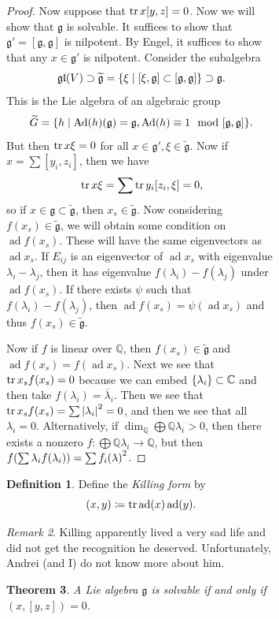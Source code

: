 \documentclass[leqno, openany]{memoir}
\newtheorem{thm}{Theorem}[section]
\theoremstyle{definition}
\newtheorem{defn}[thm]{Definition}
\theoremstyle{remark}
\newtheorem{rmk}[thm]{Remark}
\theoremstyle{plain}
\theoremstyle{definition}
\theoremstyle{remark}
\newcommand{\C}{\mathbb{C}}
\newcommand{\Q}{\mathbb{Q}}
\newcommand{\mf}[1]{\mathfrak{#1}}
\newcommand{\ol}[1]{\overline{#1}}
\newcommand{\wtl}[1]{\widetilde{#1}}
\DeclareMathOperator{\ad}{ad}
\DeclareMathOperator{\Ad}{Ad}
\begin{document}
\begin{figure}[H]
\begin{figure}[H]
\begin{proof}
    Now suppose that $\trace x[y,z] = 0$. Now we will show that $\mf{g}$ is
    solvable. It suffices to show that $\mf{g}' = [\mf{g}, \mf{g}]$ is
    nilpotent. By Engel, it suffices to show that any $x \in \mf{g}'$ is
    nilpotent. Consider the subalgebra \[ \mf{gl}(V) \supset \wtl{\mf{g}} =
    \qty{ \xi \mid [\xi, \mf{g}] \subset [\mf{g}, \mf{g}] } \supset \mf{g}. \]
    This is the Lie algebra of an algebraic group \[ \wtl{G} = \qty{h \mid \Ad
    (h) (\mf{g}) = \mf{g}, \Ad (h) \equiv 1 \mod [\mf{g}, \mf{g}]}. \] But then
    $\tr x \xi = 0$ for all $x \in \mf{g}', \xi \in \wtl{\mf{g}}$. Now if $x =
    \sum [y_i, z_i]$, then we have \[ \tr x \xi = \sum \tr y_i [z_i, \xi] = 0,
    \] so if $x \in \mf{g} \subset \wtl{\mf{g}}$, then $x_s \in \wtl{\mf{g}}$.
    Now considering $f(x_s) \in \wtl{\mf{g}}$, we will obtain some condition on
    $\ad f(x_s)$. These will have the same eigenvectors as $\ad x_s$. If
    $E_{ij}$ is an eigenvector of $\ad x_s$ with eigenvalue $\lambda_i -
    \lambda_j$, then it has eigenvalue $f(\lambda_i) - f(\lambda_j)$ under $\ad
    f(x_s)$. If there exists $\psi$ such that $f(\lambda_i) - f(\lambda_j)$,
    then $\ad f(x_s) = \psi(\ad x_s)$ and thus $f(x_s) \in \wtl{\mf{g}}$.

    Now if $f$ is linear over $\Q$, then $f(x_s) \in \wtl{\mf{g}}$ and $\ad
f(x_s) = f(\ad x_s)$. Next we see that $\tr x_s f(x_s) = 0$ because we can
embed $\qty{\lambda_i} \subset \C$ and then take $f(\lambda_i) =
\ol{\lambda}_i$. Then we see that $\tr x_s f(x_s) = \sum \abs{\lambda_i}^2 =
0$, and then we see that all $\lambda_i = 0$. Alternatively, if $\dim_{\Q}
\bigoplus \Q \lambda_i > 0$, then there exists a nonzero $f \colon \bigoplus \Q
\lambda_i \to \Q$, but then $f \qty(\sum \lambda_i f(\lambda_i)) = \sum
{f_i(\lambda)}^2$.  \end{proof}

\begin{defn} Define the \textit{Killing form} by \[ (x,y) \coloneqq \tr \ad(x)
\ad(y). \] \end{defn}

\begin{rmk} Killing apparently lived a very sad life and did not get the
recognition he deserved. Unfortunately, Andrei (and I) do not know more about
him.  \end{rmk}

\begin{thm} A Lie algebra $\mf{g}$ is solvable if and only if $(x, [y,z]) = 0$.
\end{thm}


\end{figure}
\end{figure}
\end{document}

